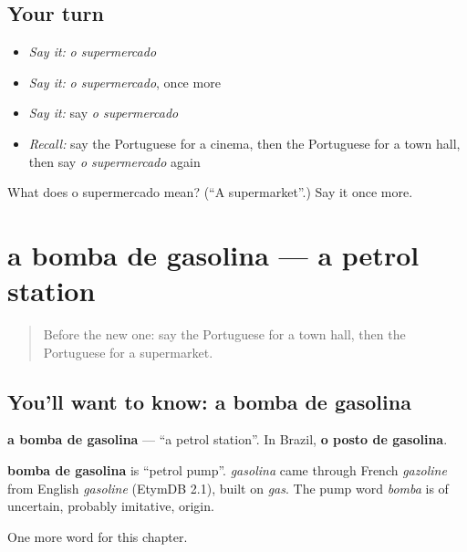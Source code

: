 \subsection*{Your turn}
\begin{itemize}
\raggedright
  \item \emph{Say it:} \emph{o supermercado}
  \item \emph{Say it:} \emph{o supermercado}, once more
  \item \emph{Say it:} say \emph{o supermercado}
  \item \emph{Recall:} say the Portuguese for a cinema, then the Portuguese for a town hall, then say \emph{o supermercado} again
\end{itemize}

\begin{tcolorbox}[breakable,colback=teal!4,colframe=teal!35!black,title={Before you move on}]
What does o supermercado mean? (\textquotedblleft{}A supermarket\textquotedblright{}.) Say it once more.
\end{tcolorbox}
\section[a bomba de gasolina]{a bomba de gasolina — a petrol station}

\label{lesson:PT-C86-bomba-de-gasolina}



\begin{quote}
Before the new one: say the Portuguese for a town hall, then the Portuguese for a supermarket.
\end{quote}

\subsection*{You'll want to know: a bomba de gasolina}
\textbf{a bomba de gasolina} — \textquotedblleft{}a petrol station\textquotedblright{}. In Brazil, \textbf{o posto de gasolina}.

\begin{cousinweb}
\textbf{bomba de gasolina} is \textquotedblleft{}petrol pump\textquotedblright{}. \emph{gasolina} came through French \emph{gazoline} from English \emph{gasoline} (EtymDB 2.1), built on \emph{gas}. The pump word \emph{bomba} is of uncertain, probably imitative, origin.
\end{cousinweb}

\begin{grammarlens}[title={What you've built}]
One more word for this chapter.
\end{grammarlens}

